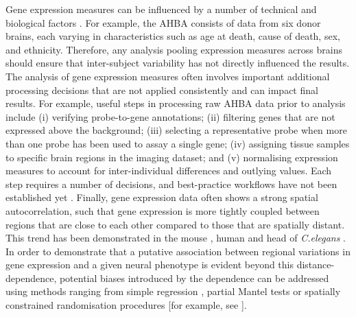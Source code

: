 Gene expression measures can be influenced by a number of technical and biological factors \citep{Fraser2005,Berchtold2008,Kumar2013,Trabzuni2013}.
For example, the AHBA consists of data from six donor brains, each varying in characteristics such as age at death, cause of death, sex, and ethnicity. Therefore, any analysis pooling expression measures across brains should ensure that inter-subject variability has not directly influenced the results. The analysis of gene expression measures often involves important additional processing decisions that are not applied consistently and can impact final results. For example, useful steps in processing raw AHBA data prior to analysis include (i) verifying probe-to-gene annotations; (ii) filtering genes that are not expressed above the background; (iii) selecting a representative probe when more than one probe has been used to assay a single gene; (iv) assigning tissue samples to specific brain regions in the imaging dataset; and (v) normalising expression measures to account for inter-individual differences and outlying values. Each step requires a number of decisions, and best-practice workflows have not been established yet \citep{Arnatkeviciute2019}.
Finally, gene expression data often shows a strong spatial autocorrelation, such that gene expression is more tightly coupled between regions that are close to each other compared to those that are spatially distant. This trend has been demonstrated in the mouse \citep{Fulcher2016}, human \citep{Richiardi2015,Krienen2016,Pantazatos2017,Vertes2016b,Arnatkeviciute2019} and head of \textit{C.elegans} \citep{Arnatkeviciute2018}.
In order to demonstrate that a putative association between regional variations in gene expression and a given neural phenotype is evident beyond this distance-dependence, potential biases introduced by the dependence can be addressed using methods ranging from simple regression \citep{Fulcher2016}, partial Mantel tests \citep{French2011,Ji2014,Fakhry2015} or spatially constrained randomisation procedures [for example, see \citep{Vertes2016b,Burt2017,Seidlitz2018,Arnatkeviciute2019}].

